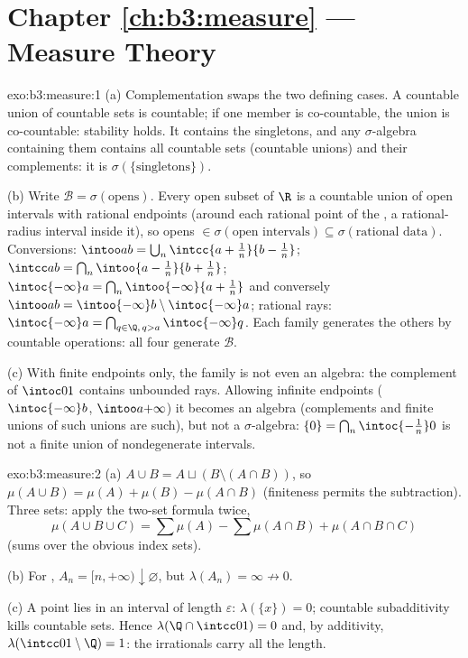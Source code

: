 \section*{Chapter \ref{ch:b3:measure} --- Measure Theory}

\begin{solution}{exo:b3:measure:1}
(a) Complementation swaps the two defining cases. A countable
union of countable sets is countable; if one member is
co-countable, the union is co-countable: stability holds. It
contains the singletons, and any $\sigma$-algebra containing
them contains all countable sets (countable unions) and their
complements: it is $\sigma(\{\text{singletons}\})$.

(b) Write $\mathcal B = \sigma(\text{opens})$. Every open
subset of $\R$ is a countable union of open intervals with
rational endpoints (around each rational point of the ,
a rational-radius interval inside it), so opens $\in
\sigma(\text{open intervals}) \subseteq \sigma(\text{rational
data})$. Conversions: $\intoo ab = \bigcup_n\intcc{a +
\frac1n}{b - \frac1n}$; $\intcc ab = \bigcap_n \intoo{a -
\frac1n}{b + \frac1n}$; $\intoc{-\infty}a = \bigcap_n
\intoo{-\infty}{a + \frac1n}$ and conversely $\intoo ab =
\intoo{-\infty}b \setminus \intoc{-\infty}a$; rational rays:
$\intoc{-\infty}a =
\bigcap_{q \in \Q,\, q > a}\intoc{-\infty}q$. Each family
generates the others by countable operations: all four generate
$\mathcal B$.

(c) With finite endpoints only, the family is not even an
algebra: the complement of $\intoc01$ contains unbounded rays.
Allowing infinite endpoints ($\intoc{-\infty}b$, $\intoo
a{+\infty}$) it becomes an algebra (complements and finite
unions of such unions are such), but not a $\sigma$-algebra:
$\{0\} = \bigcap_n\intoc{-\frac1n}0$ is not a finite union of
nondegenerate intervals.
\end{solution}

\begin{solution}{exo:b3:measure:2}
(a) $A \cup B = A \sqcup (B \setminus (A\cap B))$, so
$\mu(A\cup B) = \mu(A) + \mu(B) - \mu(A\cap B)$ (finiteness
permits the subtraction). Three sets: apply the two-set formula
twice,
\[
\mu(A\cup B\cup C) = \sum\mu(A) - \sum\mu(A\cap B) +
\mu(A\cap B\cap C)
\]
(sums over the obvious index sets).

(b) For , $A_n = [n, +\infty) \downarrow
\varnothing$, but $\lambda(A_n) = \infty \not\to 0$.

(c) A point lies in an interval of length $\varepsilon$:
$\lambda(\{x\}) = 0$; countable subadditivity kills countable
sets. Hence $\lambda(\Q \cap \intcc01) = 0$ and, by additivity,
$\lambda(\intcc01\setminus\Q) = 1$: the irrationals carry all
the length.
\end{solution}

